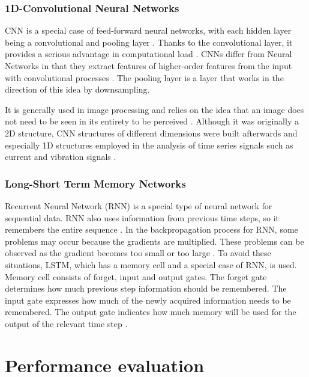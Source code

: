 \subsubsection{1D-Convolutional Neural Networks}

CNN is a special case of feed-forward neural networks, with each hidden layer being a convolutional and pooling layer \cite{skowron2020convolutional}. Thanks to the convolutional layer, it provides a serious advantage in computational load \cite{skowron2020convolutional}. CNNs differ from Neural Networks in that they extract features of higher-order features from the input with convolutional processes \cite{chen2021improved}. The pooling layer is a layer that works in the direction of this idea by downsampling.

It is generally used in image processing and relies on the idea that an image does not need to be seen in its entirety to be perceived \cite{khan2018review}. Although it was originally a 2D structure, CNN structures of different dimensions were built afterwards and especially 1D structures employed in the analysis of time series signals such as current and vibration signals \cite{eren2019generic}.

\subsubsection{Long-Short Term Memory Networks}

Recurrent Neural Network (RNN) is a special type of neural network for sequential data. RNN also uses information from previous time steps, so it remembers the entire sequence \cite{sabir2019lstm}. In the backpropagation process for RNN, some problems may occur because the gradients are multiplied. These problems can be observed as the gradient becomes too small or too large \cite{sabir2019lstm}. To avoid these situations, LSTM, which has a memory cell and a special case of RNN, is used. Memory cell consists of forget, input and output gates. The forget gate determines how much previous step information should be remembered. The input gate expresses how much of the newly acquired information needs to be remembered. The output gate indicates how much memory will be used for the output of the relevant time step \cite{shenfield2020novel}.

\section{Performance evaluation}


